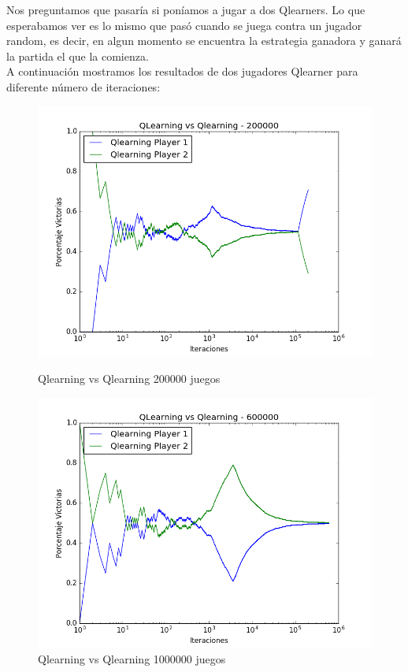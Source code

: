Nos preguntamos que pasaría si poníamos a jugar a dos Qlearners. Lo que esperabamos ver es lo mismo que pasó cuando se juega contra un jugador random, es decir, en algun momento se encuentra la estrategia ganadora y ganará la partida el que la comienza.\\

A continuación mostramos los resultados de dos jugadores Qlearner para diferente número de iteraciones:

\begin{figure}[h]
 \centering
 \begin{minipage}{.45\textwidth}
	\centering
	\includegraphics[scale=0.35]{img1/QlearningVsQlearning_200000_6x5_merge.png}
        \caption{Qlearning vs Qlearning 200000 juegos}
  \end{minipage}
 \begin{minipage}{.5\textwidth}
	\centering
	\includegraphics[scale=0.35]{img1/QlearningVsQlearning_600000_6x5_merge.png}
        \caption{Qlearning vs Qlearning 1000000 juegos}
  \end{minipage}
\end{figure}



